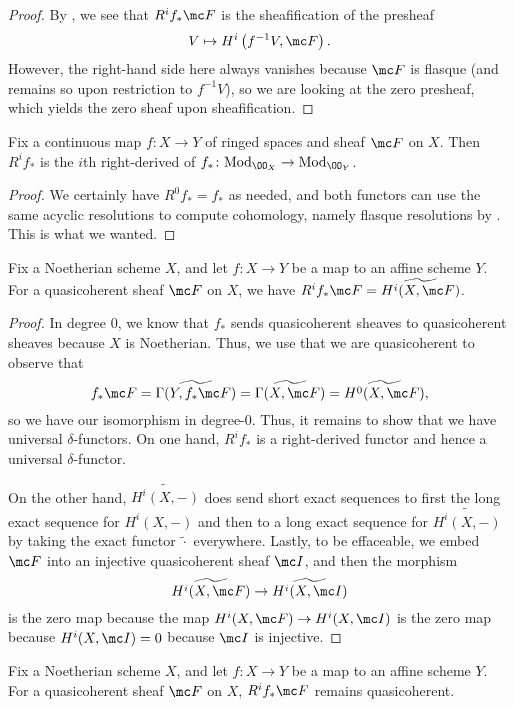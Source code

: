 \documentclass[../notes.tex]{subfiles}
\begin{document}
\begin{proof}
	By , we see that $R^if_*\mc F$ is the sheafification of the presheaf
	\[V\mapsto H^i\left(f^{-1}V,\mc F\right).\]
	However, the right-hand side here always vanishes because $\mc F$ is flasque (and remains so upon restriction to $f^{-1}V$), so we are looking at the zero presheaf, which yields the zero sheaf upon sheafification.
\end{proof}
\begin{corollary}
	Fix a continuous map $f\colon X\to Y$ of ringed spaces and sheaf $\mc F$ on $X$. Then $R^if_*$ is the $i$th right-derived of $f_*\colon\mathrm{Mod}_{\OO_X}\to\mathrm{Mod}_{\OO_Y}$.
\end{corollary}
\begin{proof}
	We certainly have $R^0f_*=f_*$ as needed, and both functors can use the same acyclic resolutions to compute cohomology, namely flasque resolutions by . This is what we wanted.
\end{proof}
\begin{proposition} \label{prop:get-higher-direct-image-qcoh}
	Fix a Noetherian scheme $X$, and let $f\colon X\to Y$ be a map to an affine scheme $Y$. For a quasicoherent sheaf $\mc F$ on $X$, we have $R^if_*\mc F=\widetilde{H^i(X,\mc F)}$.
\end{proposition}
\begin{proof}
	In degree $0$, we know that $f_*$ sends quasicoherent sheaves to quasicoherent sheaves because $X$ is Noetherian. Thus, we use that we are quasicoherent to observe that
	\[f_*\mc F=\widetilde{\Gamma(Y,f_*\mc F)}=\widetilde{\Gamma(X,\mc F)}=\widetilde{H^0(X,\mc F)},\]
	so we have our isomorphism in degree-$0$. Thus, it remains to show that we have universal $\delta$-functors. On one hand, $R^if_*$ is a right-derived functor and hence a universal $\delta$-functor.
	
	On the other hand, $\widetilde{H^i(X,-)}$ does send short exact sequences to first the long exact sequence for $H^i(X,-)$ and then to a long exact sequence for $\widetilde{H^i(X,-)}$ by taking the exact functor $\widetilde\cdot$ everywhere. Lastly, to be effaceable, we embed $\mc F$ into an injective quasicoherent sheaf $\mc I$, and then the morphism
	\[\widetilde{H^i(X,\mc F)}\to\widetilde{H^i(X,\mc I)}\]
	is the zero map because the map $H^i(X,\mc F)\to H^i(X,\mc I)$ is the zero map because $H^i(X,\mc I)=0$ because $\mc I$ is injective.
\end{proof}
\begin{corollary}
	Fix a Noetherian scheme $X$, and let $f\colon X\to Y$ be a map to an affine scheme $Y$. For a quasicoherent sheaf $\mc F$ on $X$, $R^if_*\mc F$ remains quasicoherent.
\end{corollary}
\end{document}
